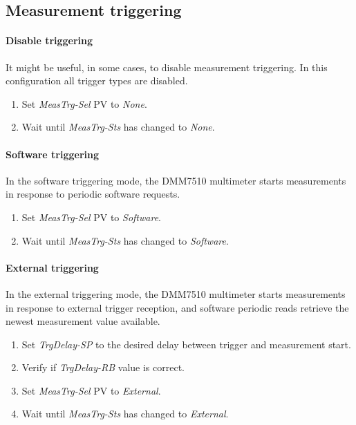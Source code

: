 \documentclass[openany]{article}
\begin{document}
	\subsection{Measurement triggering}

		\paragraph{Disable triggering}\label{disable-triggering} It might be useful, in some cases, to disable measurement triggering. In this configuration all trigger types are disabled.

			\begin{enumerate}
			\item Set \emph{MeasTrg-Sel} PV to \emph{None}.
			\item Wait until \emph{MeasTrg-Sts} has changed to \emph{None}.
			\end{enumerate}

		\paragraph{Software triggering} In the software triggering mode, the DMM7510 multimeter starts measurements in response to periodic software requests.

			\begin{enumerate}
			\item Set \emph{MeasTrg-Sel} PV to \emph{Software}.
			\item Wait until \emph{MeasTrg-Sts} has changed to \emph{Software}.
			\end{enumerate}

		\paragraph{External triggering} In the external triggering mode, the DMM7510 multimeter starts measurements in response to external trigger reception, and software periodic reads retrieve the newest measurement value available.

			\begin{enumerate}
			\item Set \emph{TrgDelay-SP} to the desired delay between trigger and measurement start.
			\item Verify if \emph{TrgDelay-RB} value is correct.
			\item Set \emph{MeasTrg-Sel} PV to \emph{External}.
			\item Wait until \emph{MeasTrg-Sts} has changed to \emph{External}.
			\end{enumerate}
\end{document}
